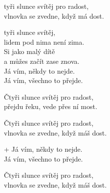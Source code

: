 
\ve{}
tyři slunce svítěj pro radost,\qquad {}\qquad {}\qquad {}\\ 
vlnovka se zvedne, když má dost.\qquad {}\qquad {}\qquad {}

\cho{}
tyři slunce svítěj,\\
lidem pod nima není zima.\\
Si jako malý dítě\\
a můžes začít zase znova.\\
Já vím, někdy to nejde.\qquad {}\\
Já vím, všechno to přejde.\qquad {}

\ve{}
Čtyři slunce svítěj pro radost,\\
přejdu řeku, vede přes ní most.

\cho{}

\ve{}
Čtyři slunce svítěj pro radost,\\
vlnovka se zvedne, když máš dost.

\cho{}
+ Já vím, někdy to nejde.\\
Já vím, všechno to přejde.

\ve{}
Čtyři slunce svítěj pro radost,\\
vlnovka se zvedne, když máš dost. 

\esong